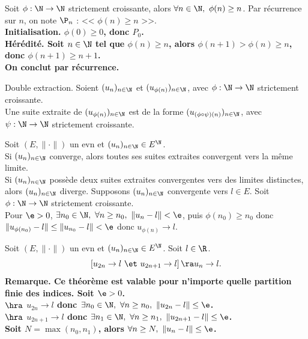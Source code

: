 \documentclass[11pt]{article}
\begin{document}
\begin{lemme}{}{}
    Soit $\phi:\N\to\N$ strictement croissante, alors $\forall n \in \N, ~ \phi(n)\geq n$.
    \tcblower
    Par récurrence sur $n$, on note $\P_n$ : << $\phi(n)\geq n$ >>.\\
    \bf{Initialisation.} $\phi(0)\geq0$, donc $P_0$.\\
    \bf{Hérédité.} Soit $n\in\N$ tel que $\phi(n)\geq n$, alors $\phi(n+1)>\phi(n)\geq n$, donc $\phi(n+1)\geq n+1$.\\
    On conclut par récurrence.
\end{lemme}

\vspace*{-0.7cm}

\begin{defi}{Double extraction.}{}
    Soient $(u_n)_{n\in\N}$ et $(u_{\phi(n)})_{n\in\N}$, avec $\phi:\N\to\N$ strictement croissante.\\
    Une suite extraite de $(u_{\phi(n)})_{n\in\N}$ est de la forme $(u_{(\phi\circ\psi)(n)})_{n\in\N}$, avec $\psi:\N\to\N$ strictement croissante.
\end{defi}

\vspace*{-0.7cm}

\begin{prop}{}{}
    Soit $(E,\|\cdot\|)$ un evn et $(u_n)_{n\in\N}\in E^\N$.\\
    Si $(u_n)_{n\in\N}$ converge, alors toutes ses suites extraites convergent vers la même limite.\\
    Si $(u_n)_{n\in\N}$ possède deux suites extraites convergentes vers des limites distinctes, alors $(u_n)_{n\in\N}$ diverge.
    \tcblower
    Supposons $(u_n)_{n\in\N}$ convergente vers $l\in E$. Soit $\phi:\N\to\N$ strictement croissante.\\
    Pour $\e>0$, $\exists n_0 \in \N, ~ \forall n \geq n_0, ~ \|u_n-l\| < \e$, puis $\phi(n_0)\geq n_0$ donc $\|u_{\phi(n_0)}-l\|\leq \|u_{n_0} - l\| < \e$ donc $u_{\phi(n)}\to l$.
\end{prop}

\vspace*{-0.7cm}

\begin{prop}{}{}
    Soit $(E,\|\cdot \|)$ un evn et $(u_n)_{n\in\N}\in E^\N$. Soit $l\in\R$.
    \begin{equation*}
        \left[ u_{2n} \to l ~\et~ u_{2n+1} \to l \right] \ra u_n \to l.
    \end{equation*}
    \bf{Remarque.} Ce théorème est valable pour n'importe quelle partition finie des indices.
    \tcblower
    Soit $\e>0$.\\
    $\hra$ $u_{2n}\to l$ donc $\exists n_0 \in \N, ~ \forall n \geq n_0, ~ \|u_{2n}-l\|\leq \e$.\\
    $\hra$ $u_{2n+1}\to l$ donc $\exists n_1 \in \N, ~ \forall n \geq n_1, ~ \|u_{2n+1}-l\|\leq \e$.\\
    Soit $N=\max(n_0,n_1)$, alors $\forall n \geq N, ~ \|u_n - l\| \leq \e$.
\end{prop}
\end{document}
